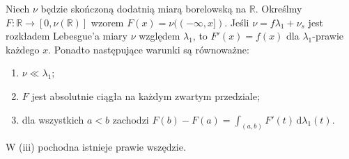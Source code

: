 \begin{twierdzenie}
\label{thm:cdf-derivative-25}
Niech $\nu$ będzie skończoną dodatnią miarą borelowską
na $\mathbb R$. Określmy $F:\mathbb R\to[0,\nu(\mathbb R)]$
wzorem $F(x)=\nu(( -\infty,x])$.
Jeśli $\nu=f\lambda_1+\nu_s$ jest rozkładem Lebesgue'a
miary $\nu$ względem $\lambda_1$, to
$F'(x)=f(x)$ dla $\lambda_1$-prawie każdego $x$.
Ponadto następujące warunki są równoważne:
\begin{enumerate}[label=(\roman*)]
\item $\nu\ll\lambda_1$;
\item $F$ jest absolutnie ciągła na każdym zwartym
przedziale;
\item dla wszystkich $a<b$ zachodzi
$F(b)-F(a)=\int_{(a,b)}F'(t)\,\mathrm d\lambda_1(t)$.
\end{enumerate}
W (iii) pochodna istnieje prawie wszędzie.
\end{twierdzenie}

